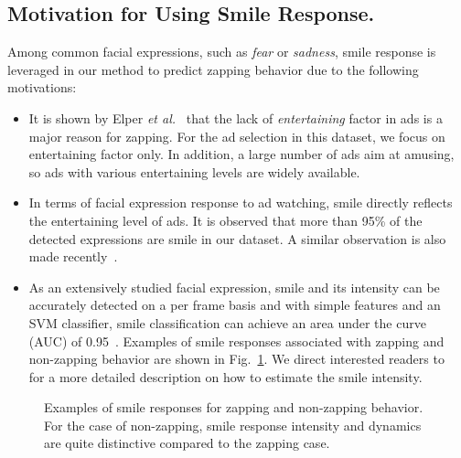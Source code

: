 \documentclass[twoside,leqno,twocolumn]{article}
\begin{document}
\subsection{Motivation for Using Smile Response.}
Among common facial expressions, such as \textit{fear} or \textit{sadness}, smile response is leveraged in our method to predict zapping behavior due to the following motivations:
\begin{itemize}
\item It is shown by Elper \textit{et al.}~\cite{Elpers03} that the lack of \textit{entertaining} factor in ads is a major reason for zapping. For the ad selection in this dataset, we focus on entertaining factor only. In addition, a large number of ads aim at amusing, so ads with various entertaining levels are widely available. 

\item In terms of facial expression response to ad watching, smile directly reflects the entertaining level of ads. It is observed that more than 95\% of the detected expressions are smile in our dataset. A similar observation is also made recently~\cite{amfed}. 

\item As an extensively studied facial expression, smile and its intensity can be accurately detected on a per frame basis and with simple features and an SVM classifier, smile classification can achieve an area under the curve (AUC) of 0.95~\cite{Yang_TAC14}. Examples of smile responses associated with zapping and non-zapping behavior are shown in Fig.~\ref{fig:smile_ex}. We direct interested readers to~\cite{Yang_TAC14} for a more detailed description on how to estimate the smile intensity.


\end{itemize}

\begin{figure}[t] 
\centering
\caption{Examples of smile responses for zapping and non-zapping behavior. For the case of non-zapping, smile response intensity and dynamics are quite distinctive compared to the zapping case.}
\label{fig:smile_ex}
\end{figure}
\end{document}
